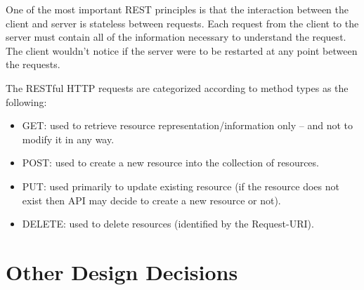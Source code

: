 \documentclass[../RASD.tex]{subfiles}
\begin{document}
    One of the most important REST principles is that the interaction between the client and server is stateless between requests. Each request from the client to the server must contain all of the information necessary to understand the request. The client wouldn’t notice if the server were to be restarted at any point between the requests.

    The RESTful HTTP requests are categorized according to method types as the following:
    \\
    \begin{itemize}
        \item GET: used to retrieve resource representation/information only – and not to modify it in any way.
        \item POST: used to create a new resource into the collection of resources.
        \item PUT: used primarily to update existing resource (if the resource does not exist
        then API may decide to create a new resource or not).
        \item DELETE: used to delete resources (identified by the Request-URI).
    \end{itemize}
    \newpage
    \section{Other Design Decisions}\label{sec:other-design-decisions}
\end{document}
